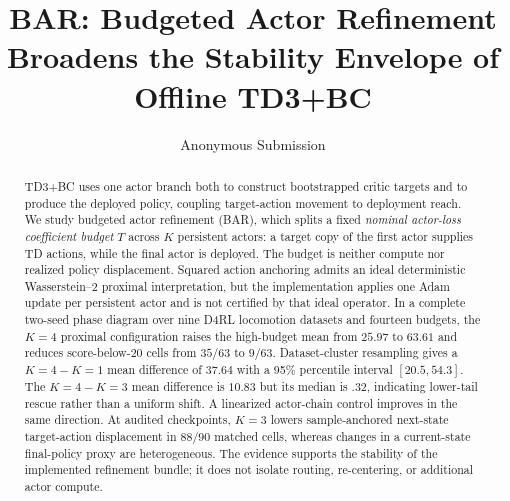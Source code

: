 \documentclass[letterpaper]{article}
\title{BAR: Budgeted Actor Refinement Broadens the Stability Envelope of Offline TD3+BC}
\author{Anonymous Submission}
\begin{document}
\maketitle

\begin{abstract}
TD3+BC uses one actor branch both to construct bootstrapped critic targets and to produce the deployed policy, coupling target-action movement to deployment reach. We study budgeted actor refinement (BAR), which splits a fixed \emph{nominal actor-loss coefficient budget} $T$ across $K$ persistent actors: a target copy of the first actor supplies TD actions, while the final actor is deployed. The budget is neither compute nor realized policy displacement. Squared action anchoring admits an ideal deterministic Wasserstein--2 proximal interpretation, but the implementation applies one Adam update per persistent actor and is not certified by that ideal operator. In a complete two-seed phase diagram over nine D4RL locomotion datasets and fourteen budgets, the $K=4$ proximal configuration raises the high-budget mean from $25.97$ to $63.61$ and reduces score-below-20 cells from $35/63$ to $9/63$. Dataset-cluster resampling gives a $K=4-K=1$ mean difference of $37.64$ with a 95\% percentile interval $[20.5,54.3]$. The $K=4-K=3$ mean difference is $10.83$ but its median is $.32$, indicating lower-tail rescue rather than a uniform shift. A linearized actor-chain control improves in the same direction. At audited checkpoints, $K=3$ lowers sample-anchored next-state target-action displacement in $88/90$ matched cells, whereas changes in a current-state final-policy proxy are heterogeneous. The evidence supports the stability of the implemented refinement bundle; it does not isolate routing, re-centering, or additional actor compute.
\end{abstract}









\label{sec:technical_end}

\clearpage

\end{document}
